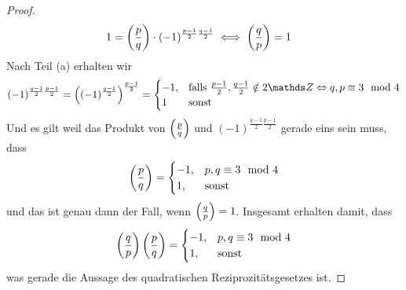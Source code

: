\begin{enumerate}[(a)]
\begin{proof}
\begin{align*}
            &1 = \left(\frac{p}{q}\right)\cdot (-1)^{\frac{p-1}{2}\frac{q-1}{2}} \iff \left(\frac{q}{p}\right) = 1
        \end{align*}
        Nach Teil (a) erhalten wir 
        \[
        (-1)^{\frac{q-1}{2}\frac{p-1}{2}} = \left((-1)^\frac{q-1}{2}\right)^\frac{p-1}{2} = \begin{cases}
            -1, & \text{falls } \frac{p-1}{2},\frac{q-1}{2}\notin 2\Z \Leftrightarrow q,p\equiv 3 \mod 4 \\
            1 & \text{sonst} 
        \end{cases}    
        \]
        Und es gilt weil das Produkt von $\left(\frac{p}{q}\right)$ und $(-1)^{\frac{q-1}{2}\frac{p-1}{2}}$ gerade eins sein muss, dass 
        \[
        \left(\frac{p}{q}\right) = \begin{cases}
            -1, & p,q\equiv 3 \mod 4 \\
            1, & \text{sonst}
        \end{cases}    
        \]
        und das ist genau dann der Fall, wenn $\left(\frac{q}{p}\right) = 1$. Insgesamt erhalten damit, dass
        \[
        \left(\frac{q}{p}\right)\left(\frac{p}{q}\right) = \begin{cases}
            -1, & p,q\equiv 3 \mod 4 \\
            1, & \text{sonst}
        \end{cases}   
        \] 
        was gerade die Aussage des quadratischen Reziprozitätsgesetzes ist.
    \end{proof}
\end{enumerate}